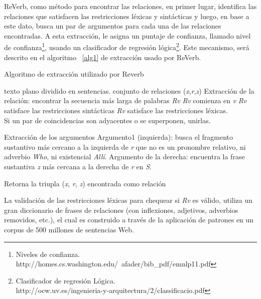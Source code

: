 ReVerb, como m\'etodo para encontrar las relaciones, en primer lugar, identifica las relaciones que satisfacen las restricciones l\'exicas y sint\'acticas y luego, en base a este dato, busca un par de argumentos para cada una de las relaciones encontradas. A esta extracci\'on, le asigna un puntaje de confianza, llamado nivel de confianza\footnote{Niveles de confianza. http://homes.cs.washington.edu/~afader/bib\_pdf/emnlp11.pdf}, usando un clasificador de regresi\'on l\'ogica\footnote{Clasificador de regresi\'on L\'ogica. \\ http://ocw.uv.es/ingenieria-y-arquitectura/2/classificacio.pdf}. Este mecanismo, ser\'a descrito en el algoritmo ~\ref{alg1} de extracci\'on usado por ReVerb.

\begin{algorithm}
\caption{Algoritmo de extracci\'on utilizado por Reverb}
\label{alg1}
\begin{algorithmic}
    \REQUIRE texto plano dividido en sentencias.
    \ENSURE conjunto de relaciones (\emph{x},\emph{r},\emph{z})
            \STATE Extracci\'on de la relaci\'on: encontrar la secuencia m\'as larga de palabras \emph{Rv}
	            \STATE \emph{Rv} comienza en \emph{v}
		 \STATE \emph{Rv} satisface las restricciones sint\'acticas
	            \STATE \emph{Rv} satisface las restricciones l\'exicas.\\
	            \STATE Si un par de coincidencias son adyacentes o se superponen, unirlas.\\
	    \ENDWHILE

	 \STATE Extracci\'on de los argumentos
	            \STATE Argumento1 (izquierda): busca el fragmento sustantivo m\'as cercano a la izquierda de \emph{r} que no es un pronombre relativo, ni adverbio \emph{Who}, ni existencial \emph{All\'i}.
		 \STATE Argumento de la derecha: encuentra la frase sustantiva \emph{z} m\'as cercana a la derecha de \emph{r} en \emph{S}.
	    \ENDWHILE
    \ENDWHILE

    \STATE Retorna la triupla (\emph{x}, \emph{r}, \emph{z}) encontrada como relaci\'on
\end{algorithmic}
\end{algorithm}

La validaci\'on de las restricciones l\'exicas para chequear si \emph{Rv} es v\'alido, utiliza un gran diccionario de frases de relaciones (con inflexiones, adjetivos, adverbios removidos, etc.), el cual es construido a trav\'es de la aplicaci\'on de patrones en un corpus de 500 millones de sentencias Web.

